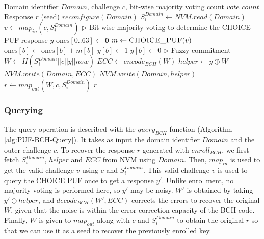 \begin{algorithm}[ht!]
\caption{$enroll_{BCH}(Domain, c, vote\_count)$}
\begin{algorithmic}[1]
    \Require Domain identifier $Domain$, challenge $c$, bit-wise majority voting count $vote\_count$
    \Ensure  Response $r$ (seed) 
    \State $reconfigure(Domain)$
    \State $S_i^{Domain} \leftarrow NVM.read(Domain)$
    \State $v \leftarrow map_{in}(c, S_i^{Domain})$
    \State \(\triangleright\) Bit-wise majority voting to determine the CHOICE PUF response $y$
 \State $\text{ones}[0..63] \leftarrow \mathbf{0}$
      \State $m \leftarrow \textsc{CHOICE\_PUF}(v)$
          \State $\text{ones}[b] \leftarrow \text{ones}[b] + m[b]$
      \EndFor
  \EndFor
          \State $y[b] \leftarrow 1$
      \Else
          \State $y[b] \leftarrow 0$
      \EndIf
  \EndFor
    \State \(\triangleright\) Fuzzy commitment
    \State $W \leftarrow H(S_i^{Domain}||c||y||now)$
    \State $ECC \leftarrow encode_{BCH}(W)$
    \State $helper \leftarrow y \oplus W$
    \State $NVM.write(Domain, ECC)$
    \State $NVM.write(Domain, helper)$
    \State $r \leftarrow map_{out}(W,c, S_i^{Domain})$ 
    \State \Return $r$
\end{algorithmic}
\label{alg:PUF-BCH-Enroll}
\end{algorithm}



\subsubsection{Querying}
The query operation is described with the $query_{BCH}$ function  (Algorithm \ref{alg:PUF-BCH-Query}). It takes as input the domain identifier $Domain$ and the outer challenge $c$. To recover the response $r$ generated with $enroll_{BCH}$, we first fetch $S_i^{Domain}$, $helper$ and $ECC$ from NVM using $Domain$. Then, $map_{in}$ is used to get the valid challenge $v$ using $c$ and $S_i^{Domain}$. This valid challenge $v$ is used to query the CHOICE PUF once to get a response $y'$. Unlike enrollment, no majority voting is performed here, so $y'$ may be noisy. $W'$ is obtained by taking $y' \oplus helper$, and $decode_{BCH}(W', ECC)$ corrects the errors to recover the original $W$, given that the noise is within the error-correction capacity of the BCH code. Finally, $W$ is given to $map_{out}$ along with $c$ and $S_i^{Domain}$ to obtain the original $r$ so that we can use it as a seed to recover the previously enrolled key.



